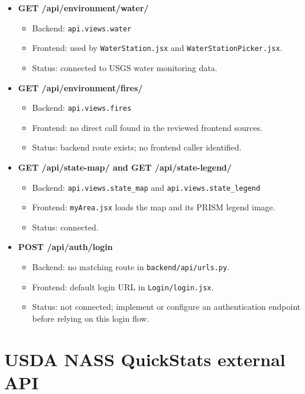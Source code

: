 \documentclass[11pt]{article}
\begin{document}
\begin{itemize}[leftmargin=1.5em, itemsep=0.55em]
\item \textbf{GET /api/environment/water/}
  \begin{itemize}[leftmargin=1.5em, itemsep=0.2em]
    \item Backend: \texttt{api.views.water}
    \item Frontend: used by \texttt{WaterStation.jsx} and \texttt{WaterStationPicker.jsx}.
    \item Status: connected to USGS water monitoring data.
  \end{itemize}

\item \textbf{GET /api/environment/fires/}
  \begin{itemize}[leftmargin=1.5em, itemsep=0.2em]
    \item Backend: \texttt{api.views.fires}
    \item Frontend: no direct call found in the reviewed frontend sources.
    \item Status: backend route exists; no frontend caller identified.
  \end{itemize}

\item \textbf{GET /api/state-map/ and GET /api/state-legend/}
  \begin{itemize}[leftmargin=1.5em, itemsep=0.2em]
    \item Backend: \texttt{api.views.state\_map} and \texttt{api.views.state\_legend}
    \item Frontend: \texttt{myArea.jsx} loads the map and its PRISM legend image.
    \item Status: connected.
  \end{itemize}

\item \textbf{POST /api/auth/login}
  \begin{itemize}[leftmargin=1.5em, itemsep=0.2em]
    \item Backend: no matching route in \texttt{backend/api/urls.py}.
    \item Frontend: default login URL in \texttt{Login/login.jsx}.
    \item Status: not connected; implement or configure an authentication endpoint before relying on this login flow.
  \end{itemize}

\end{itemize}

\section*{USDA NASS QuickStats external API}
\end{document}
